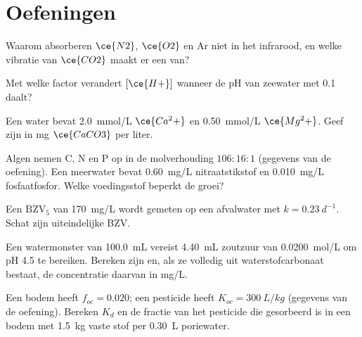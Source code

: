\section{Oefeningen}

\begin{exercise}[$\star$]\label{exo:b3:environmental-toxicology:1}
Waarom absorberen $\ce{N2}$, $\ce{O2}$ en Ar niet in het infrarood, en welke vibratie van $\ce{CO2}$ maakt er een
 van?
\end{exercise}

\begin{exercise}[$\star$]\label{exo:b3:environmental-toxicology:2}
Met welke factor verandert $[\ce{H+}]$ wanneer de pH van zeewater met 0.1 daalt?
\end{exercise}

\begin{exercise}[$\star$]\label{exo:b3:environmental-toxicology:3}
Een water bevat \qty{2.0}{mmol/L} $\ce{Ca^2+}$ en \qty{0.50}{mmol/L} $\ce{Mg^2+}$. Geef zijn  in mg $\ce{CaCO3}$ per liter.
\end{exercise}

\begin{exercise}[$\star$]\label{exo:b3:environmental-toxicology:4}
Algen nemen C, N en P op in de molverhouding $106 : 16 : 1$ (gegevens van de oefening). Een meerwater
bevat \qty{0.60}{mg/L} nitraatstikstof en \qty{0.010}{mg/L} fosfaatfosfor. Welke voedingsstof beperkt
de groei?
\end{exercise}

\begin{exercise}[$\star\star$]\label{exo:b3:environmental-toxicology:5}
Een $\mathrm{BZV_5}$ van \qty{170}{mg/L} wordt gemeten op een afvalwater met $k = \qty{0.23}{d^{-1}}$. Schat zijn uiteindelijke BZV.
\end{exercise}

\begin{exercise}[$\star\star$]\label{exo:b3:environmental-toxicology:6}
Een watermonster van \qty{100.0}{mL} vereist \qty{4.40}{mL} zoutzuur van \qty{0.0200}{mol/L} om pH 4.5 te bereiken. Bereken zijn
 en, als ze volledig uit waterstofcarbonaat bestaat, de
concentratie daarvan in mg/L.
\end{exercise}

\begin{exercise}[$\star\star$]\label{exo:b3:environmental-toxicology:7}
Een bodem heeft $f_{oc} = 0.020$; een pesticide heeft $K_{oc} = \qty{300}{L/kg}$ (gegevens van de oefening). Bereken $K_d$ en de
fractie van het pesticide die gesorbeerd is in een bodem met \qty{1.5}{kg} vaste stof per \qty{0.30}{L} poriewater.
\end{exercise}

